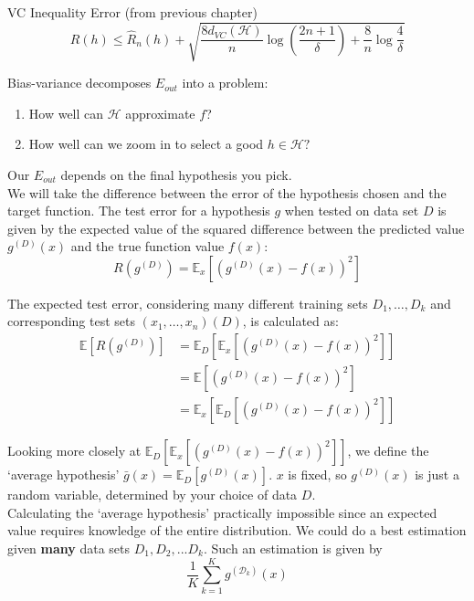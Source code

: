     \begin{definitionbox}{VC Inequality Error (from previous chapter)}
\[
R(h) \leq \widehat{R}_n(h) + \sqrt{\frac{8d_{VC}(\mathcal{H})}{n} \log\left(\frac{2n + 1}{\delta}\right) + \frac{8}{n} \log\frac{4}{\delta}}
\]
\end{definitionbox}


Bias-variance decomposes $E_{out}$ into a problem:
\begin{enumerate}
    \item How well can $\mathcal{H}$ approximate $f$?
    \item How well can we zoom in to select a good $h \in \mathcal{H}?$
\end{enumerate}

    
Our $E_{out}$ depends on the final hypothesis you pick.\\

We will take the difference between the error of the hypothesis chosen and the target function. The test error for a hypothesis \( g \) when tested on data set \( D \) is given by the expected value of the squared difference between the predicted value \( g^{(D)}(x) \) and the true function value \( f(x) \):
\begin{equation*}
R(g^{(D)}) = \mathbb{E}_x \left[ (g^{(D)}(x) - f(x))^2 \right]
\end{equation*}


The expected test error, considering many different training sets \( D_1, \dots, D_k \) and corresponding test sets \( (x_1, \dots, x_n)(D) \), is calculated as:
\begin{align*}
\mathbb{E} \left[ R(g^{(D)}) \right] &= \mathbb{E}_{D} \left[ \mathbb{E}_x \left[ (g^{(D)}(x) - f(x))^2 \right] \right] \\
&= \mathbb{E} \left[ (g^{(D)}(x) - f(x))^2 \right] \\
&= \mathbb{E}_x \left[ \mathbb{E}_{D} \left[ (g^{(D)}(x) - f(x))^2 \right] \right]
\end{align*}

Looking more closely at $\mathbb{E}_{D} \left[ \mathbb{E}_x \left[ (g^{(D)}(x) - f(x))^2 \right] \right]$, we define the `average hypothesis' $\bar{g}(x)=\mathbb{E}_{D}\left[g^{(D)}(x)\right]$. $x$ is fixed, so $g^{(D)}(x)$ is just a random variable, determined by your choice of data $D$.\\

Calculating the `average hypothesis' practically impossible since an expected value requires knowledge of the entire distribution. We could do a best estimation given \textbf{many} data sets $D_1, D_2, ... D_k$. Such an estimation is given by \[\frac1K\sum_{k=1}^{K}g^{(\mathcal{D}_{k})}(x)\]

